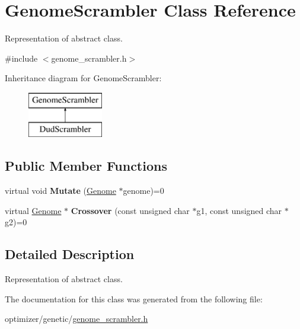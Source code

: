 \hypertarget{class_genome_scrambler}{}\section{Genome\+Scrambler Class Reference}
\label{class_genome_scrambler}


Representation of abstract class.  




{\ttfamily \#include $<$genome\+\_\+scrambler.\+h$>$}

Inheritance diagram for Genome\+Scrambler\+:\begin{figure}[H]
\begin{center}
\leavevmode
\includegraphics[height=2.000000cm]{class_genome_scrambler}
\end{center}
\end{figure}
\subsection*{Public Member Functions}
\begin{DoxyCompactItemize}
\item 
\hypertarget{class_genome_scrambler_a742dcbb2809cc85b02b10c0dbfd64c08}{}\label{class_genome_scrambler_a742dcbb2809cc85b02b10c0dbfd64c08} 
virtual void {\bfseries Mutate} (\hyperlink{class_genome}{Genome} $\ast$genome)=0
\item 
\hypertarget{class_genome_scrambler_a8301658c631bc714d31eb8d6c111b78e}{}\label{class_genome_scrambler_a8301658c631bc714d31eb8d6c111b78e} 
virtual \hyperlink{class_genome}{Genome} $\ast$ {\bfseries Crossover} (const unsigned char $\ast$g1, const unsigned char $\ast$g2)=0
\end{DoxyCompactItemize}


\subsection{Detailed Description}
Representation of abstract class. 

The documentation for this class was generated from the following file\+:\begin{DoxyCompactItemize}
\item 
optimizer/genetic/\hyperlink{genome__scrambler_8h}{genome\+\_\+scrambler.\+h}\end{DoxyCompactItemize}

